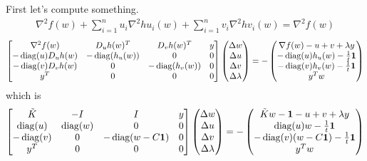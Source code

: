 \documentclass{article}
\theoremstyle{remark}
\theoremstyle{definition}
\newcommand{\diag}{\mathop{\rm diag}}
\begin{document}
\begin{enumerate}[(a)]
\begin{enumerate}[(i)]
{        First let's compute something.
        \begin{align*}
            \nabla^2 f(w) + \sum_{i=1}^n u_i\nabla^2 hu_i(w) + \sum_{i=1}^n v_i \nabla^2 hv_i(w) = \nabla^2 f(w)
        \end{align*}
        \begin{align*}
            \begin{bmatrix}
            \nabla^2 f(w) & D_u h(w)^T & D_v h(w)^T & y \\
            -\diag(u) D_uh(w) & -\diag(h_u(w)) & 0 & 0 \\
            -\diag(v) D_vh(w) & 0 & -\diag(h_v(w)) & 0 \\
            y^T & 0 & 0 & 0
            \end{bmatrix}
            \begin{pmatrix}
            \Delta w \\
            \Delta u \\
            \Delta v \\
            \Delta \lambda
            \end{pmatrix}
            =-\begin{pmatrix}
            \nabla f(w) - u + v + \lambda y \\
            -\diag(u)  h_u(w) - \frac{1}{t}\mathbf{1} \\
            -\diag(v) h_v(w) - \frac{1}{t}\mathbf{1} \\
            y^T w
            \end{pmatrix}
        \end{align*}
        which is
        \begin{align*}
            \begin{bmatrix}
            \tilde{K} & -I & I & y \\
            \diag(u) & \diag(w) & 0 & 0 \\
            -\diag(v) & 0 & -\diag(w-C\mathbf{1}) & 0 \\
            y^T & 0 & 0 & 0
            \end{bmatrix}
            \begin{pmatrix}
            \Delta w \\
            \Delta u \\
            \Delta v \\
            \Delta \lambda
            \end{pmatrix}
            =-\begin{pmatrix}
            \tilde{K}w - \mathbf{1} - u + v + \lambda y \\
            \diag(u)w - \frac{1}{t}\mathbf{1} \\
            -\diag(v) (w-C\mathbf{1}) - \frac{1}{t}\mathbf{1} \\
            y^T w
            \end{pmatrix}
        \end{align*}
        }


\end{enumerate}
\end{enumerate}
\end{document}
